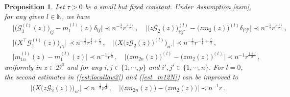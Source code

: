 \documentclass[12pt]{article}
\numberwithin{equation}{section}
\newtheorem{prop}{Proposition}
\theoremstyle{remark}
\newcommand{\1}{{\rm 1}\kern-0.24em{\rm I}}
\begin{document}
 \begin{prop} \label{thm:locallaw}
Let  $\tau>0$ be a small but fixed constant.
Under Assumption \ref{asm},  for any given $l\in\mathbb{N}$, we have  
\begin{align}
&\Big|\big( \mathcal{G}_1^{(l)}(z)\big)_{ij} - m_1^{(l)}(z) \delta_{ij} \Big|\prec  {n^{-\frac 12}}r^{\frac{1+l}{2}}\, , \quad \Big|\big(z\mathcal{G}_2(z)\big)^{(l)}_{i'j'} - \big(zm_2(z)\big)^{(l)} \delta_{i'j'} \Big| \prec  n^{-\frac 12}r^{\frac{1+l}{2}}\, , \label{est:locallaw1}\\
&\Big|\big( {X}^{\top}\mathcal{G}_1^{(l)}(z)\big)_{i'i} \Big|\prec n^{-\frac 12}r^{\frac 14+ \frac l 2}\, , \quad 
\Big|\big({X}\big(z\mathcal{G}_2(z) \big)^{(l)}\big)_{ii'} \Big|\prec  n^{-\frac 12} r^{-\frac 14+ \frac l 2}\, , \label{est:locallaw2}\\
&\big|m_{1 n}^{(l)}(z)-m^{(l)}_1(z) \big|\prec n^{-1} r^{\frac l 2}\, , \quad  \big|\big(zm_{2 n}(z)\big)^{(l)}-\big(zm_2(z)\big)^{(l)} \big|\prec  n^{-1}r^{\frac {1+l}{ 2}}\label{est_m12N}\, ,
\end{align}
uniformly in $z\in{\mathcal{D}^0} $ and for any $i, j \in \{1,\cdots, p\}$ and $i' , j' \in \{1,\cdots, n\}$. For $l=0$, the second estimates in  (\ref{est:locallaw2}) and (\ref{est_m12N}) can be improved to 
\begin{align}\label{2021051301}
\Big|\big({X}\big(z\mathcal{G}_2(z) \big)\big)_{ii'} \Big|\prec  n^{-\frac 12} r^{\frac 14}\,,\quad 
 \big|\big(zm_{2 n}(z)\big)-\big(zm_2(z)\big) \big|\prec  n^{-1}r\,.
\end{align}
\end{prop}

%
\end{document}
